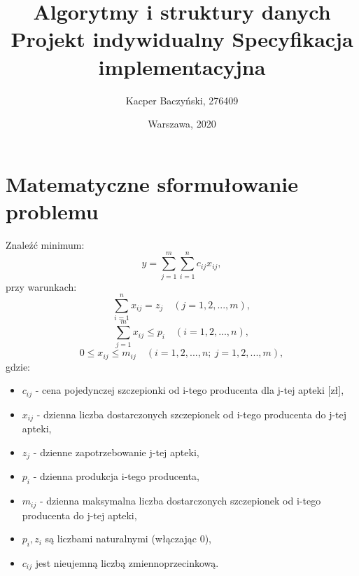 \documentclass[11pt]{article}
\title{Algorytmy i struktury danych
\\Projekt indywidualny
\bigbreak Specyfikacja implementacyjna}
\author{Kacper Baczyński, 276409}
\date{Warszawa, 2020}
\begin{document}
\maketitle

\section{Matematyczne sformułowanie problemu}
Znaleźć minimum:
$$ y = \sum\limits_{j=1}^{m}\sum\limits_{i=1}^{n}c_{ij}x_{ij}, $$
przy warunkach:
$$ \sum\limits_{i=1}^{n} x_{ij} = z_{j} \quad (j = 1, 2,..., m), $$
$$ \sum\limits_{j=1}^{m} x_{ij} \leq p_{i} \quad (i = 1, 2,..., n), $$
$$ 0 \leq x_{ij} \leq m_{ij} \quad (i = 1, 2,..., n; \ j = 1, 2,..., m), $$
gdzie:
\begin{itemize}
    \item $ c_{ij} $ - cena pojedynczej szczepionki od i-tego producenta dla j-tej apteki [zł],
    \item $ x_{ij} $ - dzienna liczba dostarczonych szczepionek od i-tego producenta do j-tej apteki,
    \item $ z_{j} $ - dzienne zapotrzebowanie j-tej apteki,
    \item $ p_{i} $ - dzienna produkcja i-tego producenta,
    \item $ m_{ij} $ - dzienna maksymalna liczba dostarczonych szczepionek od i-tego producenta do j-tej apteki,
    \item $ p_{i}, z_{i} $ są liczbami naturalnymi (włączając 0),
    \item $ c_{ij} $ jest nieujemną liczbą zmiennoprzecinkową.
\end{itemize}
\end{document}
